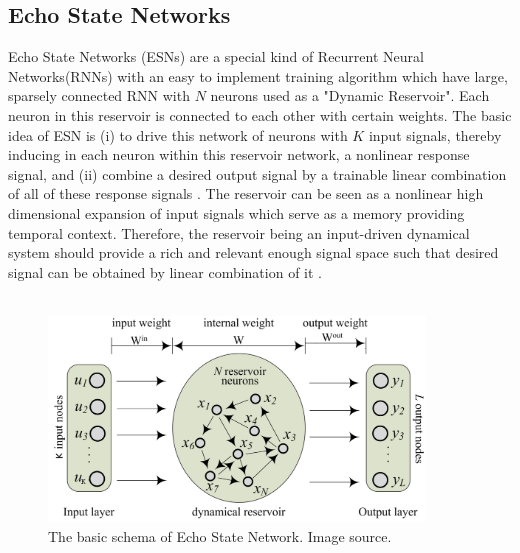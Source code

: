  
 
 \subsection{Echo State Networks}
  \indent \indent
  
 Echo State Networks (ESNs) are a special kind of Recurrent Neural Networks(RNNs) with an easy to implement training algorithm which have
 large, sparsely connected RNN with $N$ neurons used as a "Dynamic Reservoir". 
 Each neuron in this reservoir is connected to each other with certain weights. The basic idea of ESN is (i) to drive this network of neurons with $K$ input signals, thereby inducing in each neuron within this reservoir network, a nonlinear response signal, and (ii) combine a desired output signal by a trainable linear combination of all of these response signals \cite{Jaeger:2007}. %
 The reservoir can be seen as a nonlinear high dimensional expansion of input signals which serve as a memory providing temporal context. Therefore, the reservoir being an input-driven dynamical system should provide a rich and relevant enough signal space such that desired signal can be obtained by linear combination of it \cite{mantas}. 
 \\
 \\
 \begin{figure}[h]
	 \centering
	 \includegraphics[width = 10cm]{./backgroundConcepts/images/esn1}
	 \caption{The basic schema of Echo State Network. Image source\cite{Li_2015}.}
  \end{figure}
 

